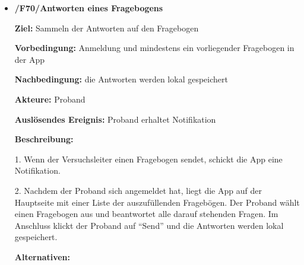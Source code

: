 \documentclass[a4paper]{scrreprt}
\begin{document}
\begin{itemize}
            \item \textbf{/F70/Antworten eines Fragebogens}

                \par \textbf{Ziel: }Sammeln der Antworten auf den Fragebogen
                \par \textbf{Vorbedingung: }Anmeldung und mindestens ein vorliegender Fragebogen in der App
                \par \textbf{Nachbedingung: }die Antworten werden lokal gespeichert
                \par \textbf{Akteure: }Proband
                \par \textbf{Auslösendes Ereignis: }Proband erhaltet Notifikation
                \par \textbf{Beschreibung: }
                \par 1. Wenn der Versuchsleiter einen Fragebogen sendet, schickt die App eine Notifikation.
                \par 2. Nachdem der Proband sich angemeldet hat, liegt die App auf der Hauptseite mit einer Liste der auszufüllenden Fragebögen. Der Proband wählt einen Fragebogen aus und beantwortet alle darauf stehenden Fragen. Im Anschluss klickt der Proband auf ``Send'' und die Antworten werden lokal gespeichert.
                \par \textbf{Alternativen: }
                \begin{figure}[ht]
                    \centering

\end{figure}
\end{itemize}
\end{document}
